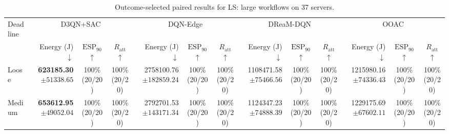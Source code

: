 \begin{table}[!t]
\centering
\caption{Outcome-selected paired results for LS: large workflows on 37 servers.}
\label{tab:conditional_case_ls}
\begingroup
\footnotesize
\setlength{\tabcolsep}{2.2pt}
\renewcommand{\arraystretch}{1.08}
\begin{tabular}{@{}l*{4}{rcc}@{}}
\toprule
Deadline & \multicolumn{3}{c}{D3QN+SAC} & \multicolumn{3}{c}{DQN-Edge} & \multicolumn{3}{c}{DReaM-DQN} & \multicolumn{3}{c}{OOAC} \\
\cmidrule(lr){2-4}\cmidrule(lr){5-7}\cmidrule(lr){8-10}\cmidrule(lr){11-13}
 & Energy (J) $\downarrow$ & $\mathrm{ESP}_{90}$ $\uparrow$ & $R_{\mathrm{att}}$ $\uparrow$ & Energy (J) $\downarrow$ & $\mathrm{ESP}_{90}$ $\uparrow$ & $R_{\mathrm{att}}$ $\uparrow$ & Energy (J) $\downarrow$ & $\mathrm{ESP}_{90}$ $\uparrow$ & $R_{\mathrm{att}}$ $\uparrow$ & Energy (J) $\downarrow$ & $\mathrm{ESP}_{90}$ $\uparrow$ & $R_{\mathrm{att}}$ $\uparrow$ \\
\midrule
Loose & \shortstack[r]{\textbf{623185.30}\\$\pm 51338.65$} & \shortstack[c]{100\%\\(20/20)} & \shortstack[c]{100\%\\(20/20)} & \shortstack[r]{2758100.76\\$\pm 182859.24$} & \shortstack[c]{100\%\\(20/20)} & \shortstack[c]{100\%\\(20/20)} & \shortstack[r]{1108471.58\\$\pm 75466.56$} & \shortstack[c]{100\%\\(20/20)} & \shortstack[c]{100\%\\(20/20)} & \shortstack[r]{1215980.16\\$\pm 74336.43$} & \shortstack[c]{100\%\\(20/20)} & \shortstack[c]{100\%\\(20/20)} \\
Medium & \shortstack[r]{\textbf{653612.95}\\$\pm 49052.04$} & \shortstack[c]{100\%\\(20/20)} & \shortstack[c]{100\%\\(20/20)} & \shortstack[r]{2792701.53\\$\pm 143171.34$} & \shortstack[c]{100\%\\(20/20)} & \shortstack[c]{100\%\\(20/20)} & \shortstack[r]{1124347.23\\$\pm 74888.39$} & \shortstack[c]{100\%\\(20/20)} & \shortstack[c]{100\%\\(20/20)} & \shortstack[r]{1229175.69\\$\pm 67602.11$} & \shortstack[c]{100\%\\(20/20)} & \shortstack[c]{100\%\\(20/20)} \\

\end{tabular}
\end{table}
